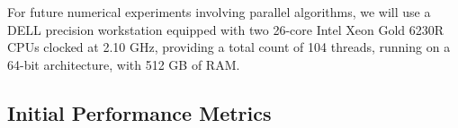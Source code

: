 For future numerical experiments involving parallel algorithms, 
we will use a DELL precision workstation equipped with two 26-core Intel Xeon Gold 6230R CPUs clocked at 2.10 GHz, providing a total count of 104 threads, running on a 64-bit architecture, with 512 GB of RAM.



\subsection{Initial Performance Metrics}
\label{sec:WP1:CGAL:metrics}



%

